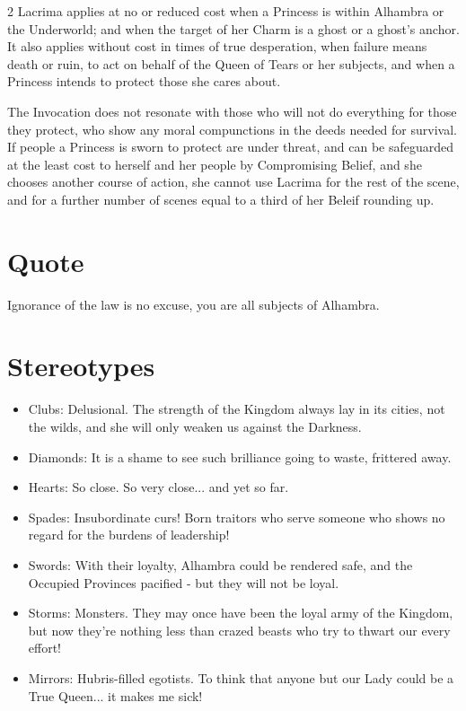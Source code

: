 \begin{multicols}{2}
Lacrima applies at no or reduced cost when a Princess is within Alhambra or the Underworld; and when the target of her Charm is a ghost or a ghost's anchor. It also applies without cost in times of true desperation, when failure means death or ruin, to act on behalf of the Queen of Tears or her subjects, and when a Princess intends to protect those she cares about.

The Invocation does not resonate with those who will not do everything for those they protect, who show any moral compunctions in the deeds needed for survival. If people a Princess is sworn to protect are under threat, and can be safeguarded at the least cost to herself and her people by Compromising Belief, and she chooses another course of action, she cannot use Lacrima for the rest of the scene, and for a further number of scenes equal to a third of her Beleif rounding up.

\section*{Quote}

Ignorance of the law is no excuse, you are all subjects of Alhambra. 

\section*{Stereotypes}

\begin{itemize}
\item Clubs: Delusional. The strength of the Kingdom always lay in its cities, not the wilds, and she will only weaken us against the Darkness.
\item Diamonds: It is a shame to see such brilliance going to waste, frittered away.
\item Hearts: So close. So very close... and yet so far.
\item Spades: Insubordinate curs! Born traitors who serve someone who shows no regard for the burdens of leadership!
\item Swords: With their loyalty, Alhambra could be rendered safe, and the Occupied Provinces pacified - but they will not be loyal.
\item Storms: Monsters. They may once have been the loyal army of the Kingdom, but now they're nothing less than crazed beasts who try to thwart our every effort!
\item Mirrors: Hubris-filled egotists. To think that anyone but our Lady could be a True Queen... it makes me sick!


\end{itemize}
\end{multicols}

